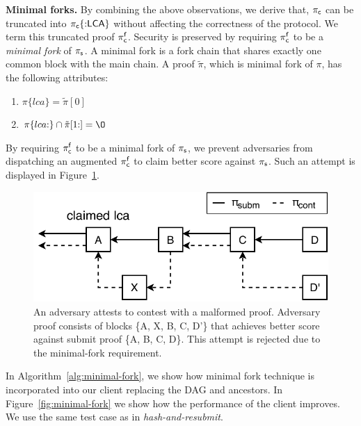 \noindent \textbf{Minimal forks.} By combining the above observations, we
derive that, $\mathsf{\pi_{c}}$ can be truncated into $\mathsf{\pi_{c}}\{{:}\mathsf{LCA}\}$ without affecting
the correctness of the protocol. We term this truncated proof $\mathsf{\pi_{c}^{f}}$.
Security is preserved by requiring $\mathsf{\pi_{c}^{f}}$ to be a \emph{minimal fork} of
$\mathsf{\pi_{s}}$. A minimal fork is a fork chain that shares exactly one common block
with the main chain. A proof $\tilde\pi$, which is minimal fork of $\pi$, has
the following attributes:

\begin{enumerate}
\item $\pi\{lca\} = \tilde\pi[0]$
\item $\pi\{lca{:}\} \cap \tilde\pi[1{:}] = \O$
\end{enumerate}

By requiring $\mathsf{\pi_{c}^{f}}$ to be a minimal fork of $\mathsf{\pi_{s}}$, we prevent adversaries
from dispatching an augmented $\mathsf{\pi_{c}^{f}}$ to claim better score against $\mathsf{\pi_{s}}$.
Such an attempt is displayed in Figure~\ref{fig:adversary-minimal-fork}.

\begin{figure}[h]
    \begin{center}
        \includegraphics[width=0.85\columnwidth]{figures/adversary-minimal-fork.pdf}
    \end{center}

    \caption{An adversary attests to contest with a malformed proof. Adversary
        proof consists of blocks \{A, X, B, C, D'\} that achieves better score
        against submit proof \{A, B, C, D\}. This attempt is rejected due to
        the minimal-fork requirement.}

    \label{fig:adversary-minimal-fork}
\end{figure}

In Algorithm~\ref{alg:minimal-fork}, we show how minimal fork technique is
incorporated into our client replacing the DAG and ancestors. In
Figure~\ref{fig:minimal-fork} we show how the performance of the client
improves. We use the same test case as in \emph{hash-and-resubmit}.

